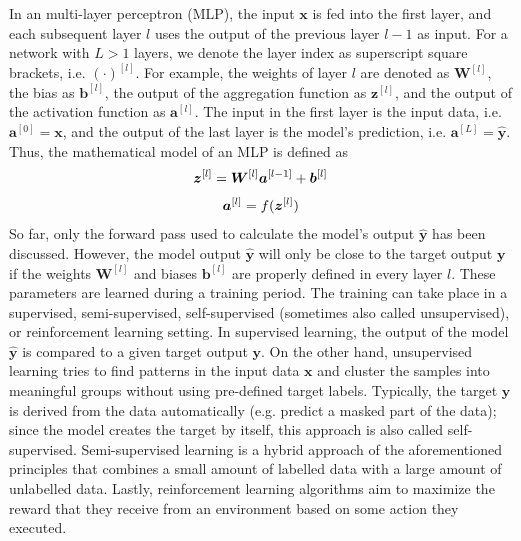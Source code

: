 In an multi-layer perceptron (MLP), the input \(\boldsymbol{x}\) is fed into the first layer, and each subsequent layer \(l\) uses the output of the previous layer \(l-1\) as input.
For a network with \(L>1\) layers, we denote the layer index as superscript square brackets, i.e. $(\cdot)^{[l]}$.
For example, the weights of layer $l$ are denoted as $\boldsymbol{W}^{[l]}$, the bias as \(\boldsymbol{b}^{[l]}\), the output of the aggregation function as \(\boldsymbol{z}^{[l]}\), and the output of the activation function as \(\boldsymbol{a}^{[l]}\).
The input in the first layer is the input data, i.e. $\boldsymbol{a}^{[0]} = \boldsymbol{x}$, and the output of the last layer is the model's prediction, i.e. $\boldsymbol{a}^{[L]} = \hat{\boldsymbol{y}}$. Thus, the mathematical model of an MLP is defined as
%
\begin{align}\eqlbl{mlp}
		\boldsymbol{z}^{[l]} = \boldsymbol{W}^{[l]}\boldsymbol{a}^{[l-1]} + \boldsymbol{b}^{[l]}
\end{align}
%
\begin{align}\eqlbl{mlp2}
		\boldsymbol{a}^{[l]} = f(\boldsymbol{z}^{[l]})
\end{align}
%
So far, only the forward pass used to calculate the model's output $\boldsymbol{\hat{y}}$ has been discussed.
However, the model output $\boldsymbol{\hat{y}}$ will only be close to the target output $\boldsymbol{y}$ if the weights $\boldsymbol{W}^{[l]}$ and biases $\boldsymbol{b}^{[l]}$ are properly defined in every layer $l$.
These parameters are learned during a training period.
The training can take place in a supervised, semi-supervised, self-supervised (sometimes also called unsupervised), or reinforcement learning setting.
In supervised learning, the output of the model $\boldsymbol{\hat{y}}$ is compared to a given target output $\boldsymbol{y}$.
On the other hand, unsupervised learning tries to find patterns in the input data $\boldsymbol{x}$ and cluster the samples into meaningful groups without using pre-defined target labels. Typically, the target $\boldsymbol{y}$ is derived from the data automatically (e.g. predict a masked part of the data); since the model creates the target by itself, this approach is also called self-supervised.
Semi-supervised learning is a hybrid approach of the aforementioned principles that combines a small amount of labelled data with a large amount of unlabelled data.
Lastly, reinforcement learning algorithms aim to maximize the reward that they receive from an environment based on some action they executed.

